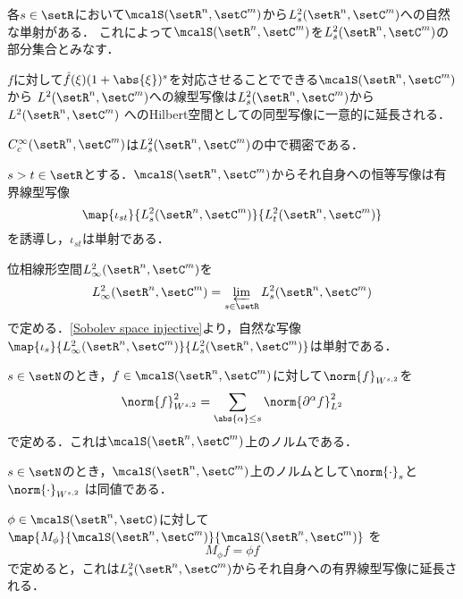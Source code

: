 \documentclass[uplatex,dvipdfmx]{jsarticle}
\newcommand{\sobolev}[1]{L^{2}_{#1}}
\newcommand{\sobolevlocal}[3]{\sobolev{#1}(\setR^{#2},\setC^{#3})}
\newcommand{\cptsmoothfct}[2]{C^{\infty}_{c}(\setR^{#1},\setC^{#2})}
\newcommand{\schwartz}[2]{\mcalS(\setR^{#1},\setC^{#2})}
\begin{document}
各$s\in \setR$において$\schwartz{n}{m}$から$\sobolevlocal{s}{n}{m}$への自然な単射がある．
これによって$\schwartz{n}{m}$を$\sobolevlocal{s}{n}{m}$の部分集合とみなす．

\begin{lemma}
  $f$に対して$\hat{f}(\xi)(1+\abs{\xi})^s$を対応させることでできる$\schwartz{n}{m}$から
  $L^2(\setR^n,\setC^m)$への線型写像は$\sobolevlocal{s}{n}{m}$から$L^2(\setR^n,\setC^m)$
  へのHilbert空間としての同型写像に一意的に延長される．
\end{lemma}

\begin{proposition}
  $\cptsmoothfct{n}{m}$は$\sobolevlocal{s}{n}{m}$の中で稠密である．
\end{proposition}

\begin{proposition}\label{Sobolev space injective}
  $s>t\in \setR$とする．$\schwartz{n}{m}$からそれ自身への恒等写像は有界線型写像
  \[ \map{\iota_{st}}{\sobolevlocal{s}{n}{m}}{\sobolevlocal{t}{n}{m}} \]
  を誘導し，$\iota_{st}$は単射である．
\end{proposition}

\begin{definition}
  位相線形空間$\sobolevlocal{\infty}{n}{m}$を
  \[ \sobolevlocal{\infty}{n}{m} = \varprojlim_{s\in\setR} \sobolevlocal{s}{n}{m} \]
  で定める．\cref{Sobolev space injective}より，自然な写像
  $\map{\iota_{s}}{\sobolevlocal{\infty}{n}{m}}{\sobolevlocal{s}{n}{m}}$は単射である．
\end{definition}

\begin{definition}
  $s\in \setN$のとき，$f\in\schwartz{n}{m}$に対して$\norm{f}_{W^{s,2}}$を
  \[ \norm{f}^2_{W^{s,2}} = \sum_{\abs{\alpha}\leq s} \norm{\partial^\alpha f}_{L^2}^2 \]
  で定める．これは$\schwartz{n}{m}$上のノルムである．
\end{definition}

\begin{proposition}
  $s\in \setN$のとき，$\schwartz{n}{m}$上のノルムとして$\norm{\cdot}_s$と$\norm{\cdot}_{W^{s,2}}$
  は同値である．
\end{proposition}

\begin{proposition}
  $\phi\in \schwartz{n}{}$に対して$\map{M_\phi}{\schwartz{n}{m}}{\schwartz{n}{m}}$
  を
  \[ M_\phi f = \phi f \]
  で定めると，これは$\sobolevlocal{s}{n}{m}$からそれ自身への有界線型写像に延長される．
\end{proposition}
\end{document}
